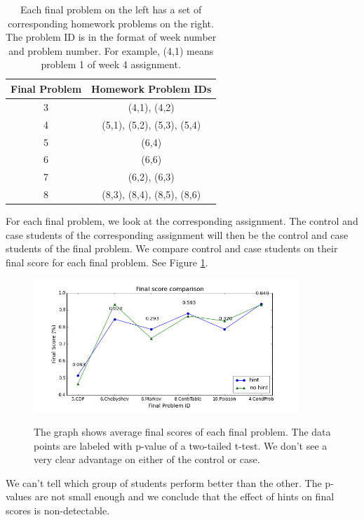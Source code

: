 \documentclass{llncs}
\begin{document}
\begin{table}[h]
\caption{Each final problem on the left has a set of corresponding homework problems on the right. The problem ID is in the format of week number and problem number. For example, (4,1) means problem 1 of week 4 assignment.}
\begin{center}
  \begin{tabular}{ c | c }
   Final Problem & Homework Problem IDs \\ \hline
	3 & (4,1), (4,2) \\
	4 & (5,1), (5,2), (5,3), (5,4) \\
    5 & (6,4) \\
    6 & (6,6) \\
    7 & (6,2), (6,3) \\
    8 & (8,3), (8,4), (8,5), (8,6) \\ \hline
  \end{tabular}
  \label{tab:map}
  \end{center}
\end{table}

For each final problem, we look at the corresponding assignment. The control and case students of the corresponding assignment will then be the control and case students of the final problem. We compare control and case students on their final score for each final problem. See Figure \ref{fig:final_compare_all}.

\begin{figure}[h]
\centering
\caption{The graph shows average final scores of each final problem. The data points are labeled with p-value of a two-tailed t-test. We don't see a very clear advantage on either of the control or case.}
\includegraphics[width=0.8\linewidth, height=5cm]{image/final_compare.png}
\label{fig:final_compare_all}
\end{figure}

We can't tell which group of students perform better than the other. The p-values are not small enough and we conclude that the effect of hints on final scores is non-detectable.
\end{document}
